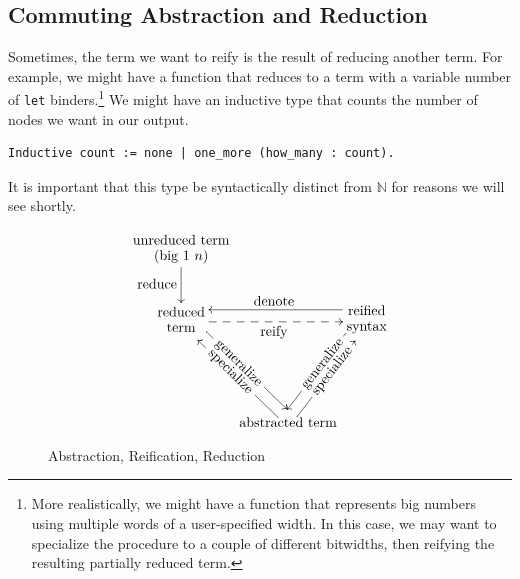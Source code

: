 \subsection{Commuting Abstraction and Reduction} \label{sec:commute-abstraction-reduction}
Sometimes, the term we want to reify is the result of reducing another term.
For example, we might have a function that reduces to a term with a variable number of \texttt{let} binders.\footnote{%
    More realistically, we might have a function that represents big numbers using multiple words of a user-specified width.
    In this case, we may want to specialize the procedure to a couple of different bitwidths, then reifying the resulting partially reduced term.%
}
We might have an inductive type that counts the number of \space nodes we want in our output.
\label{sec:count-def}
\begin{verbatim}
Inductive count := none | one_more (how_many : count).
\end{verbatim}
It is important that this type be syntactically distinct from $\mathbb N$ for reasons we will see shortly.

\begin{figure}
    \vspace{-33pt}
    \[
    \xymatrix@C=1pt{
        \txt{unreduced term \\ (big $1$ $n$)} \ar[d]_{\txt{\\reduce}} \\
        \txt{reduced \\ term}
        \ar@<1ex>[ddr]|{\txt{\rotatebox{-45}{generalize}}}
        \ar@<-1ex>@{-->}[rr]_{\txt{reify}}
        &&
        \txt{reified \\ syntax}
        \ar@<-1ex>[ll]_{\txt{denote}}
        \ar@<-1ex>[ddl]|{\txt{\rotatebox{52}{generalize}}}
        \\ \\
        &
        \txt{abstracted term}
        \ar@<1ex>[uul]|{\txt{\rotatebox{-45}{specialize}}}
        \ar@<-1ex>[uur]|{\txt{\rotatebox{52}{specialize}}}
    }
    \]
    \vspace{-10pt}
    \caption{Abstraction, Reification, Reduction} \label{fig:reduce-denote-reify}
\end{figure}

